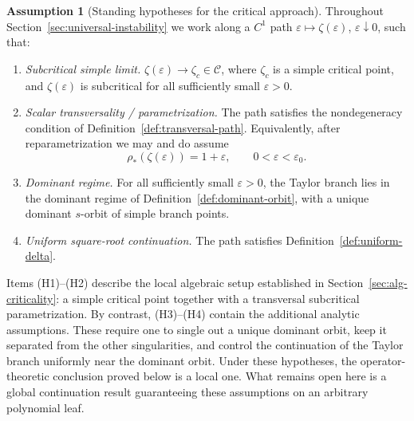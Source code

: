 \documentclass[11pt]{amsart}
\numberwithin{equation}{section}
\theoremstyle{plain}
\theoremstyle{definition}
\newtheorem{assumption}[theorem]{Assumption}
\theoremstyle{remark}
\begin{document}
\begin{assumption}[Standing hypotheses for the critical approach]
\label{ass:standing-hypotheses}
	Throughout Section~\ref{sec:universal-instability} we work along a \(C^1\) path
	\(\varepsilon\mapsto\zeta(\varepsilon)\), \(\varepsilon\downarrow0\), such that:
	\begin{enumerate}[label=\textup{(H\arabic*)},leftmargin=2.4em]
		\item \emph{Subcritical simple limit.}
		\(\zeta(\varepsilon)\to\zeta_c\in\mathcal C\), where \(\zeta_c\) is a
		simple critical point, and \(\zeta(\varepsilon)\) is subcritical for all
		sufficiently small \(\varepsilon>0\).

		\item \emph{Scalar transversality / parametrization.}
		The path satisfies the nondegeneracy condition of
		Definition~\ref{def:transversal-path}. Equivalently, after
		reparametrization we may and do assume
		\[
			\rho_*(\zeta(\varepsilon))=1+\varepsilon,
			\qquad 0<\varepsilon<\varepsilon_0.
		\]

		\item \emph{Dominant regime.}
		For all sufficiently small \(\varepsilon>0\), the Taylor branch lies in the
		dominant regime of Definition~\ref{def:dominant-orbit}, with a unique
		dominant \(s\)-orbit of simple branch points.

		\item \emph{Uniform square-root continuation.}
		The path satisfies Definition~\ref{def:uniform-delta}.
	\end{enumerate}
\end{assumption}

Items \textup{(H1)}--\textup{(H2)} describe the local algebraic setup established in
Section~\ref{sec:alg-criticality}: a simple critical point together with a
transversal subcritical parametrization. By contrast, \textup{(H3)}--\textup{(H4)}
contain the additional analytic assumptions. These require one to single out a
unique dominant orbit, keep it separated from the other singularities, and
control the continuation of the Taylor branch uniformly near the dominant orbit.
Under these hypotheses, the operator-theoretic conclusion proved below is a
local one. What remains open here is a global continuation result guaranteeing these assumptions on an arbitrary polynomial leaf.
\end{document}
